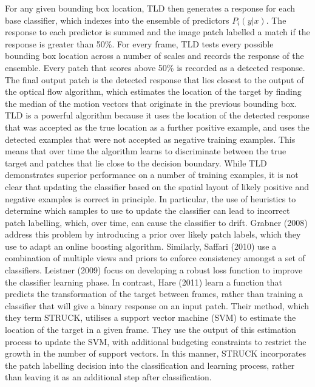 For any given bounding box location, TLD then generates a response for each base classifier, which indexes into the ensemble of predictors $P_i(y|x)$. The response to each predictor is summed and the image patch labelled a match if the response is greater than 50\%. For every frame, TLD tests every possible bounding box location across a number of scales and records the response of the ensemble. Every patch that scores above 50\% is recorded as a detected response. The final output patch is the detected response that lies closest to the output of the optical flow algorithm, which estimates the location of the target by finding the median of the motion vectors that originate in the previous bounding box. TLD is a powerful algorithm because it uses the location of the detected response that was accepted as the true location as a further positive example, and uses the detected examples that were not accepted as negative training examples. This means that over time the algorithm learns to discriminate between the true target and patches that lie close to the decision boundary. While TLD demonstrates superior performance on a number of training examples, it is not clear that updating the classifier based on the spatial layout of likely positive and negative examples is correct in principle. In particular, the use of heuristics to determine which samples to use to update the classifier can lead to incorrect patch labelling, which, over time, can cause the classifier to drift. Grabner (2008) address this problem by introducing a prior over likely patch labels, which they use to adapt an online boosting algorithm. Similarly, Saffari (2010) use a combination of multiple views and priors to enforce consistency amongst a set of classifiers. Leistner (2009) focus on developing a robust loss function to improve the classifier learning phase. In contrast, Hare (2011) learn a function that predicts the transformation of the target between frames, rather than training a classifier that will give a binary response on an input patch. Their method, which they term STRUCK, utilises a support vector machine (SVM) to estimate the location of the target in a given frame. They use the output of this estimation process to update the SVM, with additional budgeting constraints to restrict the growth in the number of support vectors. In this manner, STRUCK incorporates the patch labelling decision into the classification and learning process, rather than leaving it as an additional step after classification. 

